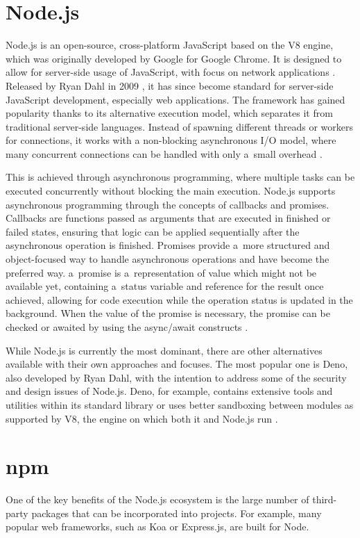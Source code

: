\section*{Node.js}
Node.js is an open-source, cross-platform JavaScript based on the V8 engine,
which was originally developed by Google for Google Chrome. It is designed to
allow for server-side usage of JavaScript, with focus on network applications
\cite{node-about}. Released by Ryan Dahl in 2009 \cite{ryan-node}, it has since
become standard for server-side JavaScript development, especially web
applications. The framework has gained popularity thanks to its alternative
execution model, which separates it from traditional server-side languages.
Instead of spawning different threads or workers for connections, it works with
a non-blocking asynchronous I/O model, where many concurrent connections can be
handled with only a~small overhead \cite{orsini_2013}.

This is achieved through asynchronous programming, where multiple tasks can be
executed concurrently without blocking the main execution. Node.js supports
asynchronous programming through the concepts of callbacks and promises.
Callbacks are functions passed as arguments that are executed in finished or
failed states, ensuring that logic can be applied sequentially after the
asynchronous operation is finished. Promises provide a~more structured and
object-focused way to handle asynchronous operations and have become the
preferred way. a~promise is a~representation of value which might not be
available yet, containing a~status variable and reference for the result once
achieved, allowing for code execution while the operation status is updated in
the background. When the value of the promise is necessary, the promise can be
checked or awaited by using the async/await constructs
\cite{PromiseJavaScriptMDN_2023}.

While Node.js is currently the most dominant, there are other alternatives
available with their own approaches and focuses. The most popular one is Deno,
also developed by Ryan Dahl, with the intention to address some of the security
and design issues of Node.js. Deno, for example, contains extensive tools and
utilities within its standard library or uses better sandboxing between modules
as supported by V8, the engine on which both it and Node.js run \cite{Deno}.

\section*{npm}
One of the key benefits of the Node.js ecosystem is the large number of
third-party packages that can be incorporated into projects. For example, many
popular web frameworks, such as Koa or Express.js, are built for Node. 

